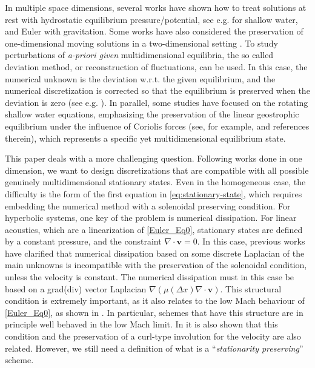 \documentclass[a4paper,10pt]{article}
\begin{document}
In multiple space dimensions,  several works have shown how to treat solutions at rest with hydrostatic  equilibrium pressure/potential,
see e.g. \cite{Audusse2004,THOMANN2020109723,CZ17,chertock2018well} for shallow water, and Euler with gravitation.
Some works have also considered the preservation of one-dimensional  moving solutions in a two-dimensional setting 
\cite{MICHELDANSAC2021105152,Ricchiuto2011,Ricchiuto2015,Ciallella2025,Mantri2024}.  
To study perturbations of \emph{a-priori given} multidimensional equilibria, the  so called  deviation method, or  reconstruction of fluctuations,
can be used. In this case,  the numerical unknown is the deviation w.r.t. the given equilibrium,  and the numerical discretization is corrected so that the   equilibrium   is preserved when the deviation is zero (see e.g.
\cite{doi:10.1137/060674879,doi:10.1137/18M1196704,GCD18,Ciallella2022,Dumbser2024,BERBERICH2021104858}).
In parallel, some studies have focused on the rotating shallow water equations, emphasizing the preservation of the linear geostrophic equilibrium under the influence of Coriolis forces (see, for example, \cite{audusse2025energy,delpino2025} and references therein), which represents a specific yet multidimensional equilibrium state.

This paper deals with a more challenging question. Following works done in one dimension, we want to design 
discretizations that are compatible with all possible genuinely multidimensional stationary states.
Even in the homogeneous case, the difficulty is the  form of the first equation in \eqref{eq:stationary-state}, which requires embedding the numerical method
with a solenoidal preserving condition. 
For hyperbolic systems, one  key of the  problem is numerical dissipation. 
For linear acoustics, which are a linearization of \eqref{Euler_Eq0},  stationary states are defined by a constant pressure, and 
the constraint $\nabla\cdot \mathbf{v} =0$.  
In this case,  previous works 
\cite{barsukow17a,barsukow2025structure} have clarified that numerical dissipation based on some discrete Laplacian of the main unknowns
is incompatible  with the preservation of the solenoidal condition, unless the velocity is constant. 
The numerical dissipation must in this case be based on a grad(div) vector Laplacian $\nabla ( \mu(\Delta x) \nabla\cdot \mathbf{v}).$ 
This structural condition is extremely important, as it also relates to
the low Mach behaviour of \eqref{Euler_Eq0}, as shown in \cite{jung2022steady,jung2024behavior}. 
In particular, schemes that have 
this structure are in principle well behaved in the low Mach limit. In \cite{jung2022steady,jung2024behavior,barsukow17a,barsukow2025structure} it is also shown that  
this condition and the preservation of a curl-type involution  for the  velocity are also related.
However, we still  need a   definition of  what is a ``\emph{stationarity preserving}''  scheme.  
\end{document}
